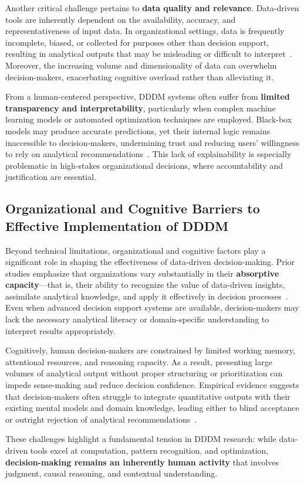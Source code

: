 \documentclass{sfuthesis}
\begin{document}
Another critical challenge pertains to \textbf{data quality and relevance}. Data-driven tools are inherently dependent on the availability, accuracy, and representativeness of input data. In organizational settings, data is frequently incomplete, biased, or collected for purposes other than decision support, resulting in analytical outputs that may be misleading or difficult to interpret~\cite{sarker_data_2021}. Moreover, the increasing volume and dimensionality of data can overwhelm decision-makers, exacerbating cognitive overload rather than alleviating it.\par
From a human-centered perspective, DDDM systems often suffer from \textbf{limited transparency and interpretability}, particularly when complex machine learning models or automated optimization techniques are employed. Black-box models may produce accurate predictions, yet their internal logic remains inaccessible to decision-makers, undermining trust and reducing users’ willingness to rely on analytical recommendations~\cite{bubeck_sparks_2023}. This lack of explainability is especially problematic in high-stakes organizational decisions, where accountability and justification are essential.
\subsection{Organizational and Cognitive Barriers to Effective Implementation of DDDM}
Beyond technical limitations, organizational and cognitive factors play a significant role in shaping the effectiveness of data-driven decision-making. Prior studies emphasize that organizations vary substantially in their\textbf{ absorptive capacity}—that is, their ability to recognize the value of data-driven insights, assimilate analytical knowledge, and apply it effectively in decision processes~\cite{mba_in_management_lamar_university_usa_impact_2025}. Even when advanced decision support systems are available, decision-makers may lack the necessary analytical literacy or domain-specific understanding to interpret results appropriately.\par
Cognitively, human decision-makers are constrained by limited working memory, attentional resources, and reasoning capacity. As a result, presenting large volumes of analytical output without proper structuring or prioritization can impede sense-making and reduce decision confidence. Empirical evidence suggests that decision-makers often struggle to integrate quantitative outputs with their existing mental models and domain knowledge, leading either to blind acceptance or outright rejection of analytical recommendations~\cite{rahman_data-driven_2021}.\par
These challenges highlight a fundamental tension in DDDM research: while data-driven tools excel at computation, pattern recognition, and optimization, \textbf{decision-making remains an inherently human activity} that involves judgment, causal reasoning, and contextual understanding.
\end{document}
